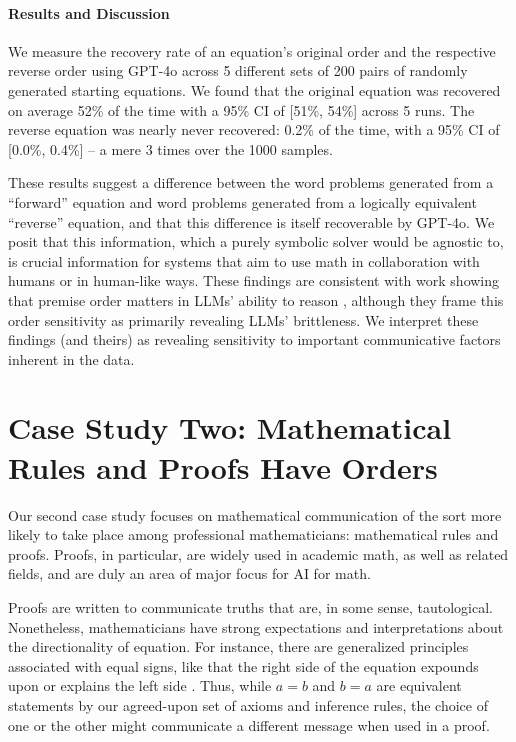 \documentclass{article}
\begin{document}
\paragraph{Results and Discussion} We measure the recovery rate of an equation's original order and the respective reverse order using GPT-4o across 5 different sets of 200 pairs of randomly generated starting equations. 
We found that the original equation was recovered on average 52\% of the time with a 95\% CI of [51\%, 54\%] across 5 runs. The reverse equation was nearly never recovered: 0.2\% of the time, with a 95\% CI of [0.0\%, 0.4\%] -- a mere 3 times over the 1000 samples.

These results suggest a difference between the word problems generated from a ``forward'' equation and word problems generated from a logically equivalent ``reverse'' equation, and that this difference is itself recoverable by GPT-4o.
We posit that this information, which a purely symbolic solver would be agnostic to, is crucial information for systems that aim to use math in collaboration with humans or in human-like ways.
These findings are consistent with work showing that premise order matters in LLMs' ability to reason \citep{berglund2024reversalcursellmstrained, chen2024premise, wu2024exploring}, although they frame this order sensitivity as primarily revealing LLMs' brittleness. 
We interpret these findings (and theirs) as revealing sensitivity to important communicative factors inherent in the data.


\section{Case Study Two: Mathematical Rules and Proofs Have Orders}

Our second case study focuses on mathematical communication of the sort more likely to take place among professional mathematicians: mathematical rules and proofs.
Proofs, in particular, are widely used in academic math, as well as related fields, and are duly an area of major focus for AI for math.

Proofs are written to communicate truths that are, in some sense, tautological.
Nonetheless, mathematicians have strong expectations and interpretations about the directionality of equation. 
For instance, there are generalized principles associated with equal signs, like that the right side of the equation expounds upon or explains the left side \citep{mirin2022mathematicians}.
Thus, while $a = b$ and $b = a$ are equivalent statements by our agreed-upon set of axioms and inference rules, the choice of one or the other might communicate a different message when used in a proof.
\end{document}
